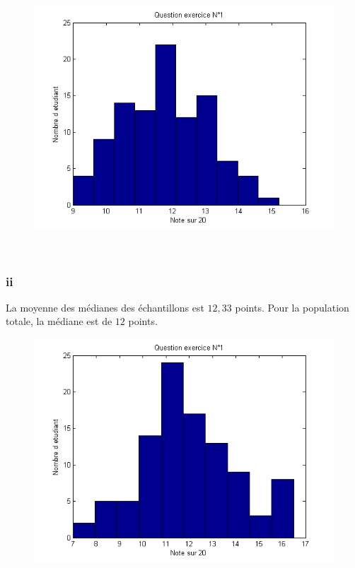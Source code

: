 \documentclass[10pt,a4paper]{article}
\begin{document}
\begin{figure}[H]
\centering
\includegraphics[scale= 0.5]{2bi_graphe.png}
\end{figure}
\ \\

\subsubsection*{ii}


La moyenne des médianes des échantillons est $12,33$ points. Pour la population totale, la médiane est de $12$ points. 

\begin{figure}[H]
\centering
\includegraphics[scale= 0.5]{2bii_graphe.png}
\end{figure}
\ \\
\end{document}
